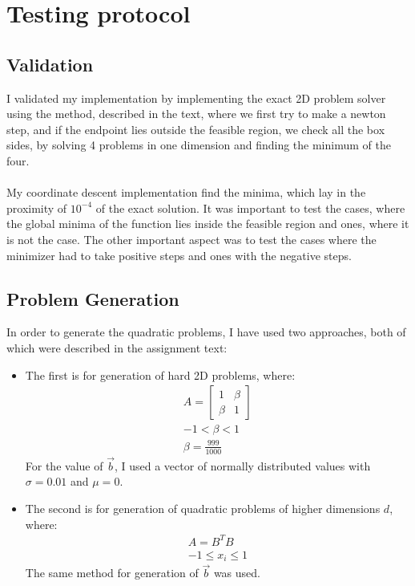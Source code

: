 \documentclass[a4paper]{article}
\begin{document}
\section{Testing protocol}
\subsection{Validation}
I validated my implementation by implementing the exact 2D problem solver using
the method, described in the text, where we first try to make a newton step, and
if the endpoint lies outside the feasible region, we check all the box sides, by
solving 4 problems in one dimension and finding the minimum of the four. \\\\
My coordinate descent implementation find the minima, which lay in the proximity
of $10^{-4}$ of the exact solution. It was important to test the cases, where
the global minima of the function lies inside the feasible region and ones,
where it is not the case. The other important aspect was
to test the cases where the minimizer had to take positive steps and ones with
the negative steps.

\subsection{Problem Generation}
In order to generate the quadratic problems, I have used two approaches, both of
which were described in the assignment text:
\begin{itemize}
\item The first is for generation of hard 2D problems, where:
  \[
  \begin{aligned}
    A=\left[\begin{array}{ll}1 & \beta \\ \beta & 1\end{array}\right]\\
    -1 < \beta < 1 \\
    \beta = \frac{999}{1000}
  \end{aligned}
  \]
  For the value of $\vec{b}$, I used a vector of normally distributed values
  with $\sigma=0.01$ and $\mu=0$.
\item The second is for generation of quadratic problems of higher dimensions $d$, where:
  \[
  \begin{aligned}
    A = B^TB\\
    -1 \leq x_i \leq 1
  \end{aligned}
  \]
  The same method for generation of $\vec{b}$ was used.
\end{itemize}
\end{document}
